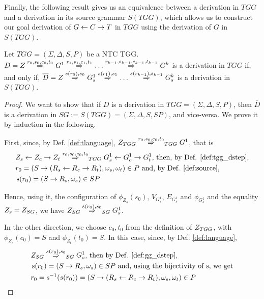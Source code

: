 \documentclass[runningheads]{llncs}
\begin{document}
Finally, the following result gives us an equivalence between a derivation in $TGG$ and a derivation in its source grammar $S(TGG)$, which allows us to construct our goal derivation of $G \overset{}{\leftarrow} C \overset{}{\rightarrow} T$ in $TGG$ using the derivation of $G$ in $S(TGG)$.

\begin{theorem}
	\label{thm:one_d_enough}
	Let $TGG = (\Sigma, \Delta, S, P)$ be a NTC TGG. \\
	$D = \startTG{} \tderiv{r_0}{s_0,c_0,t_0}{} G^1 \tderiv{r_1}{s_1,c_1,t_1}{} \dots \tderiv{r_{k-1}}{s_{k-1},c_{k-1},t_{k-1}}{} G^k$ is a derivation in $TGG$ if, and only if, $\overline{D} = \startG{} \deriv{s(r_0)}{s_0}{} G^1_s \deriv{s(r_1)}{s_1}{} \dots \deriv{s(r_{k-1})}{s_{k-1}}{} G^k_s$ is a derivation in $S(TGG)$.
\end{theorem}
\begin{proof}
	We want to show that if $D$ is a derivation in $TGG = (\Sigma, \Delta, S, P)$, then $\overline{D}$ is a derivation in $SG := S(TGG) = (\Sigma, \Delta, S, SP)$, and vice-versa. We prove it by induction in the following.
	
	First, since, by Def. \ref{def:tlanguage}, $\startTG{TGG} \tderiv{r_0}{s_0,c_0,t_0}{TGG} G^1$, that is
	\begin{align*}
		& Z_s \ms{} Z_c \mt{} Z_t \tderiv{r_0}{s_0,c_0,t_0}{TGG} G^1_s \ms{} G^1_c \mt{} G^1_t \text{, then, by Def. \ref{def:tgg_dstep},}\\
		& r_0 = (S \pro (R_s \ms{} R_c \mt{} R_t), \omega_s, \omega_t) \in P \text{ and, by Def. \ref{def:source},}\\
		& \source(r_0) = (S \pro R_s, \omega_s) \in SP
	\end{align*}
	
	Hence, using it, the configuration of $\phi_{Z_s}(s_0)$, $V_{G^1_s}$, $E_{G^1_s}$ and $\phi_{G^1_s}$ and the equality $Z_s = Z_{SG}$, we have $\startG{SG} \deriv{\source(r_0)}{s_0}{SG} G^1_s$.
	
	In the other direction, we choose $c_0, t_0$ from the definition of $Z_{TGG}$, with $\phi_{Z_c}(c_0) = S$ and  $\phi_{Z_t}(t_0) = S$. In this case, since, by Def. \ref{def:language},
	\begin{align*}
		& \startG{SG} \deriv{s(r_0)}{s_0}{SG} G^1_s \text{, then by Def. \ref{def:gg_dstep},}\\
		& \source(r_0) = (S \pro R_s, \omega_s) \in SP \text{ and, using the bijectivity of $\source$, we get}\\
		& r_0 = \source^{-1}(s(r_0)) = (S \pro (R_s \ms{} R_c \mt{} R_t), \omega_s, \omega_t) \in P
	\end{align*}
	

\end{proof}
\end{document}
